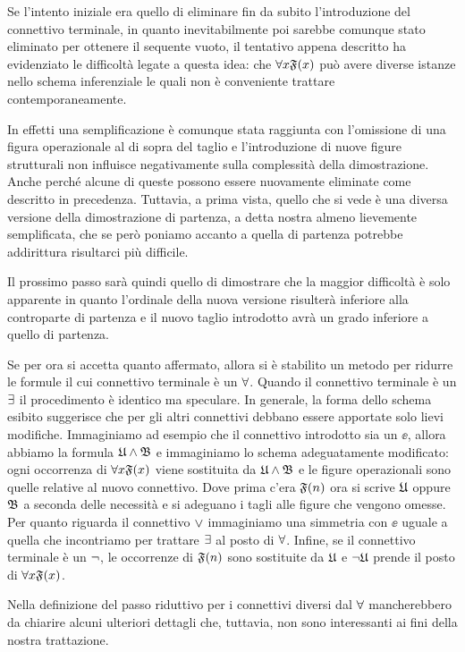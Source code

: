 		Se l'intento iniziale era quello di eliminare fin da subito l'introduzione del connettivo terminale, in quanto inevitabilmente poi sarebbe comunque stato eliminato per ottenere il sequente vuoto, il tentativo appena descritto ha evidenziato le difficoltà legate a questa idea: che $\forall x \mathfrak{F}(x)$ può avere diverse istanze nello schema inferenziale le quali non è conveniente trattare contemporaneamente. 
		
		In effetti una semplificazione è comunque stata raggiunta con l'omissione di una figura operazionale al di sopra del taglio e l'introduzione di nuove figure strutturali non influisce negativamente sulla complessità della dimostrazione. Anche perché alcune di queste possono essere nuovamente eliminate come descritto in precedenza. Tuttavia, a prima vista, quello che si vede è una diversa versione della dimostrazione di partenza, a detta nostra almeno lievemente semplificata, che se però poniamo accanto a quella di partenza potrebbe addirittura risultarci più difficile. 
		
		Il prossimo passo sarà quindi quello di dimostrare che la maggior difficoltà è solo apparente in quanto l'ordinale della nuova versione risulterà inferiore alla controparte di partenza e il nuovo taglio introdotto avrà un grado inferiore a quello di partenza.
		
		Se per ora si accetta quanto affermato, allora si è stabilito un metodo per ridurre le formule il cui connettivo terminale è un $\forall$. Quando il connettivo terminale è un $\exists$ il procedimento è identico ma speculare. In generale, la forma dello schema esibito suggerisce che per gli altri connettivi debbano essere apportate solo lievi modifiche.
		Immaginiamo ad esempio che il connettivo introdotto sia un $\ee$, allora abbiamo la formula $\mathfrak{U} \land \mathfrak{B}$ e immaginiamo lo schema adeguatamente modificato: ogni occorrenza di $\forall x \mathfrak{F}(x)$ viene sostituita da $\mathfrak{U} \land \mathfrak{B}$ e le figure operazionali sono quelle relative al nuovo connettivo. Dove prima c'era $\mathfrak{F}(n)$ ora si scrive $\mathfrak{U}$ oppure $\mathfrak{B}$ a seconda delle necessità e si adeguano i tagli alle figure che vengono omesse. Per quanto riguarda il connettivo $\lor$ immaginiamo una simmetria con $\ee$ uguale a quella che incontriamo per trattare $\exists$ al posto di $\forall$.
		Infine, se il connettivo terminale è un $\neg$, le occorrenze di $\mathfrak{F}(n)$ sono sostituite da $\mathfrak{U}$ e $\neg \mathfrak{U}$ prende il posto di $\forall x \mathfrak{F}(x)$. 
		
		Nella definizione del passo riduttivo per i connettivi diversi dal $\forall$ mancherebbero da chiarire alcuni ulteriori dettagli che, tuttavia, non sono interessanti ai fini della nostra trattazione.

